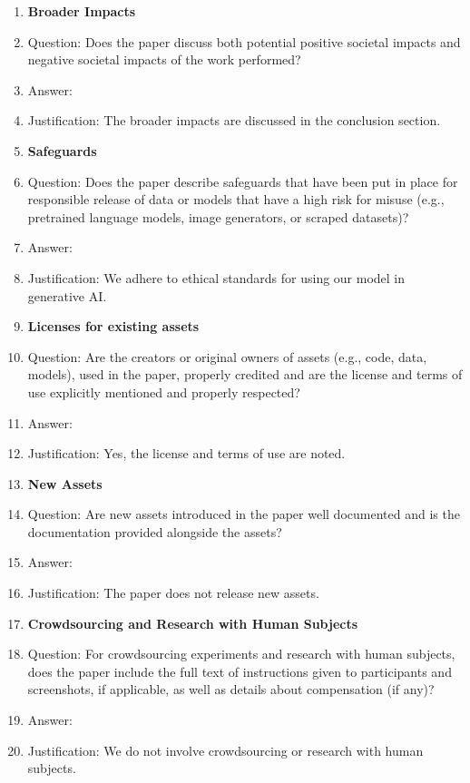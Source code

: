 \documentclass[nohyperref]{article}
\theoremstyle{plain}
\theoremstyle{remark}
\begin{document}
\begin{enumerate}
\item {\bf Broader Impacts}
    \item[] Question: Does the paper discuss both potential positive societal impacts and negative societal impacts of the work performed?
    \item[] Answer: \answerYes{} %
    \item[] Justification: The broader impacts are discussed in the conclusion section.

\item {\bf Safeguards}
    \item[] Question: Does the paper describe safeguards that have been put in place for responsible release of data or models that have a high risk for misuse (e.g., pretrained language models, image generators, or scraped datasets)?
    \item[] Answer: \answerYes{} %
    \item[] Justification: We adhere to ethical standards for using our model in generative AI.
    
\item {\bf Licenses for existing assets}
    \item[] Question: Are the creators or original owners of assets (e.g., code, data, models), used in the paper, properly credited and are the license and terms of use explicitly mentioned and properly respected?
    \item[] Answer: \answerYes{} %
    \item[] Justification: Yes, the license and terms of use are noted.
 

\item {\bf New Assets}
    \item[] Question: Are new assets introduced in the paper well documented and is the documentation provided alongside the assets?
    \item[] Answer: \answerNA{} %
    \item[] Justification: The paper does not release new assets.
    

\item {\bf Crowdsourcing and Research with Human Subjects}
    \item[] Question: For crowdsourcing experiments and research with human subjects, does the paper include the full text of instructions given to participants and screenshots, if applicable, as well as details about compensation (if any)? 
    \item[] Answer: \answerNA{} %
    \item[] Justification: We do not involve crowdsourcing or research with human subjects.
    


\end{enumerate}
\end{document}
